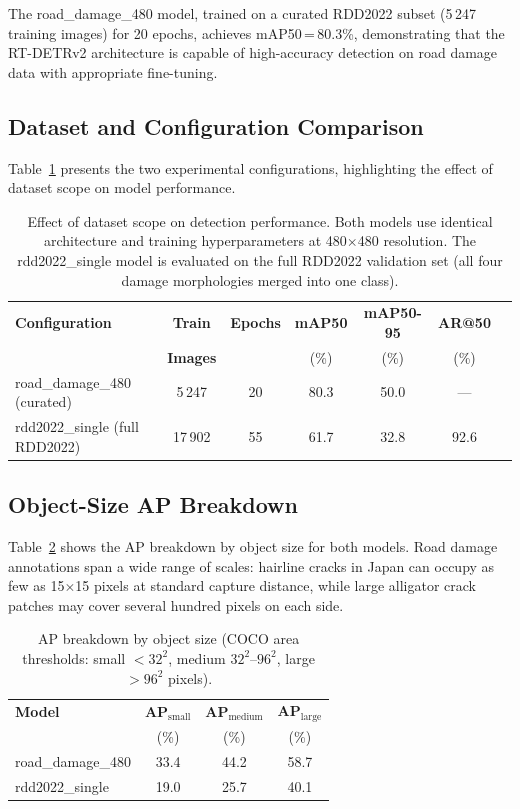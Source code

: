 \documentclass[conference]{IEEEtran}
\begin{document}
The road\_damage\_480 model, trained on a curated RDD2022 subset (5\,247 training
images) for 20 epochs, achieves mAP50\,=\,80.3\%, demonstrating that the RT-DETRv2
architecture is capable of high-accuracy detection on road damage data with
appropriate fine-tuning.

\subsection{Dataset and Configuration Comparison}

Table~\ref{tab:ablation} presents the two experimental configurations, highlighting
the effect of dataset scope on model performance.

\begin{table}[h]
\caption{Effect of dataset scope on detection performance. Both models use identical
architecture and training hyperparameters at 480$\times$480 resolution.
The rdd2022\_single model is evaluated on the full RDD2022 validation set (all four
damage morphologies merged into one class).}
\label{tab:ablation}
\centering
\begin{tabular}{lcccccc}
\toprule
\textbf{Configuration} & \textbf{Train} & \textbf{Epochs} &
\textbf{mAP50} & \textbf{mAP50-95} & \textbf{AR@50} \\
 & \textbf{Images} & & (\%) & (\%) & (\%) \\
\midrule
road\_damage\_480 (curated) & 5\,247 & 20 & 80.3 & 50.0 & --- \\
rdd2022\_single (full RDD2022) & 17\,902 & 55 & 61.7 & 32.8 & 92.6 \\
\bottomrule
\end{tabular}
\end{table}

\subsection{Object-Size AP Breakdown}

Table~\ref{tab:apsize} shows the AP breakdown by object size for both models.
Road damage annotations span a wide range of scales: hairline cracks in Japan can
occupy as few as 15$\times$15 pixels at standard capture distance, while large
alligator crack patches may cover several hundred pixels on each side.

\begin{table}[h]
\caption{AP breakdown by object size (COCO area thresholds:
small $<32^2$, medium $32^2$--$96^2$, large $>96^2$ pixels).}
\label{tab:apsize}
\centering
\begin{tabular}{lccc}
\toprule
\textbf{Model} & \textbf{AP$_\text{small}$} & \textbf{AP$_\text{medium}$} &
\textbf{AP$_\text{large}$} \\
 & (\%) & (\%) & (\%) \\
\midrule
road\_damage\_480 & 33.4 & 44.2 & 58.7 \\
rdd2022\_single   & 19.0 & 25.7 & 40.1 \\
\bottomrule
\end{tabular}
\end{table}
\end{document}
